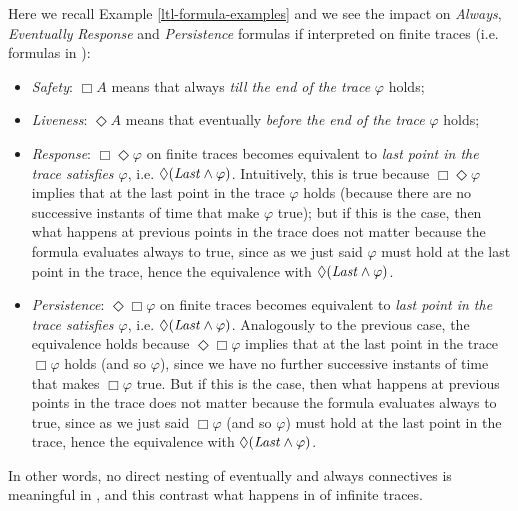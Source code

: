 \begin{example}\label{ltlf-formula-examples}
	Here we recall Example \ref{ltl-formula-examples} and we see the impact on \emph{Always}, \emph{Eventually} \emph{Response} and \emph{Persistence} \LTL formulas if interpreted on finite traces (i.e. formulas in \LTLf):
	\begin{itemize}
		\item \emph{Safety}: $\Box A$ means that always \emph{till the end of the trace} $\varphi$ holds;
		\item \emph{Liveness}: $\Diamond A$ means that eventually \emph{before the end of the trace} $\varphi$ holds;
		\item \emph{Response}: $\Box \Diamond \varphi$ on finite
		 traces becomes equivalent to \emph{last point in the trace satisfies $\varphi$}, i.e. $\Diamond(\mathit{Last} \wedge \varphi)$. Intuitively, this is true because $\Box \Diamond \varphi$ implies that at the last point in the trace $\varphi$ holds (because there are no successive instants of time that make $\varphi$ true); but if this is the case, then what happens at previous points in the trace does not matter because the formula evaluates always to true, since as we just said $\varphi$ must hold at the last point in the trace, hence the equivalence with $\Diamond(\mathit{Last} \wedge \varphi)$.
		\item \emph{Persistence}: $\Diamond \Box \varphi$ on finite traces becomes equivalent to \emph{last point in the trace satisfies $\varphi$}, i.e. $\Diamond(\mathit{Last} \wedge \varphi)$. Analogously to the previous case, the equivalence holds because $\Diamond \Box \varphi$ implies that at the last point in the trace $\Box \varphi$ holds (and so $\varphi$), since we have no further successive instants of time that makes $\Box \varphi$ true. But if this is the case, then what happens at previous points in the trace does not matter because the formula evaluates always to true, since as we just said $\Box \varphi$ (and so $\varphi$) must hold at the last point in the trace, hence the equivalence with $\Diamond(\mathit{Last} \wedge \varphi)$.
	\end{itemize}
	In other words, no direct nesting of eventually and always connectives is meaningful in \LTLf, and this contrast what happens in \LTL of infinite traces.
\end{example}

